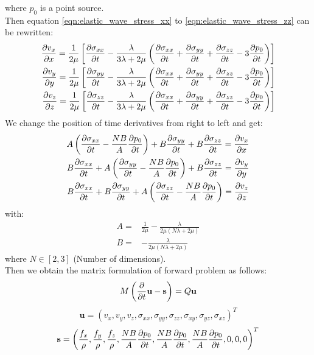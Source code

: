\documentclass[pdftex,a4paper,parskip,listof=totoc,bibliography=totoc,onehalfspacing,12pt]{scrreprt}
\begin{document}
where $p_0$ is a point source.\\
Then equation \ref{eqn:elastic_wave_stress_xx} to \ref{eqn:elastic_wave_stress_zz} can be rewritten:
\begin{align}
\label{eqn:elastic_wave_velocity_xx}
\pdv{v_x}{x}=\frac{1}{2\mu} \left[\pdv{\sigma_{xx}}{t} - \frac{\lambda}{3\lambda+2\mu} \left(\pdv{\sigma_{xx}}{t}+\pdv{\sigma_{yy}}{t}+\pdv{\sigma_{zz}}{t}-3\pdv{p_0}{t}\right)\right]\\
\pdv{v_y}{y}=\frac{1}{2\mu} \left[\pdv{\sigma_{yy}}{t} - \frac{\lambda}{3\lambda+2\mu} \left(\pdv{\sigma_{xx}}{t}+\pdv{\sigma_{yy}}{t}+\pdv{\sigma_{zz}}{t}-3\pdv{p_0}{t}\right)\right]\\
\label{eqn:elastic_wave_velocity_zz}
\pdv{v_z}{z}=\frac{1}{2\mu} \left[\pdv{\sigma_{zz}}{t} - \frac{\lambda}{3\lambda+2\mu} \left(\pdv{\sigma_{xx}}{t}+\pdv{\sigma_{yy}}{t}+\pdv{\sigma_{zz}}{t}-3\pdv{p_0}{t}\right)\right]
\end{align}
We change the position of time derivatives from right to left and get:
\begin{align}
A \left( \pdv{\sigma_{xx}}{t}-\frac{NB}{A} \pdv{p_0}{t} \right) + B \pdv{\sigma_{yy}}{t}+B\pdv{\sigma_{zz}}{t}=\pdv{v_x}{x}\\
B\pdv{\sigma_{xx}}{t} + A \left( \pdv{\sigma_{yy}}{t}-\frac{NB}{A} \pdv{p_0}{t} \right)+B\pdv{\sigma_{zz}}{t}=\pdv{v_y}{y}\\
B\pdv{\sigma_{xx}}{t} + B \pdv{\sigma_{yy}}{t}+A \left( \pdv{\sigma_{zz}}{t}-\frac{NB}{A} \pdv{p_0}{t} \right)=\pdv{v_z}{z}
\end{align}
with:
\begin{align}
A=&\frac{1}{2\mu}-\frac{\lambda}{2\mu(N\lambda+2\mu)}\\
B=&-\frac{\lambda}{2\mu(N\lambda+2\mu)}
\end{align}
where $N\in[2,3]$ (Number of dimensions).\\
Then we obtain the matrix formulation of forward problem as follows:
\begin{equation}
 M\left( \pdv{}{t}\mathbf{u}-\mathbf{s} \right) =Q\mathbf{u}
\end{equation}
\begin{equation}
\mathbf{u}=\left(v_x,v_y,v_z,\sigma_{xx},\sigma_{yy},\sigma_{zz},\sigma_{xy},\sigma_{yz} ,\sigma_{xz} \right)^T
\end{equation}
\begin{equation}
\mathbf{s}=\left(\frac{f_x}{\rho}, \frac{f_y}{\rho}, \frac{f_z}{\rho},\frac{NB}{A} \pdv{p_0}{t},\frac{NB}{A} \pdv{p_0}{t},\frac{NB}{A} \pdv{p_0}{t},0,0,0\right)^T
\end{equation}
\end{document}
